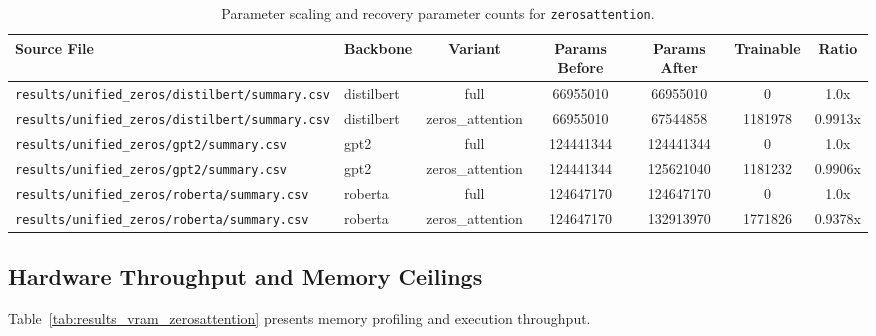 \begin{table}[t]
\centering
\small
\begin{tabular}{llccccc}
\toprule
\textbf{Source File} & \textbf{Backbone} & \textbf{Variant} & \textbf{Params Before} & \textbf{Params After} & \textbf{Trainable} & \textbf{Ratio} \\
\midrule
\texttt{results/unified\_zeros/distilbert/summary.csv} & distilbert & full & 66955010 & 66955010 & 0 & 1.0x \\
\texttt{results/unified\_zeros/distilbert/summary.csv} & distilbert & zeros\_attention & 66955010 & 67544858 & 1181978 & 0.9913x \\
\texttt{results/unified\_zeros/gpt2/summary.csv} & gpt2 & full & 124441344 & 124441344 & 0 & 1.0x \\
\texttt{results/unified\_zeros/gpt2/summary.csv} & gpt2 & zeros\_attention & 124441344 & 125621040 & 1181232 & 0.9906x \\
\texttt{results/unified\_zeros/roberta/summary.csv} & roberta & full & 124647170 & 124647170 & 0 & 1.0x \\
\texttt{results/unified\_zeros/roberta/summary.csv} & roberta & zeros\_attention & 124647170 & 132913970 & 1771826 & 0.9378x \\
\bottomrule
\end{tabular}
\caption{Parameter scaling and recovery parameter counts for \texttt{zerosattention}.}
\label{tab:results_params_zerosattention}
\end{table}

\subsection{Hardware Throughput and Memory Ceilings}
Table~\ref{tab:results_vram_zerosattention} presents memory profiling and execution throughput.

